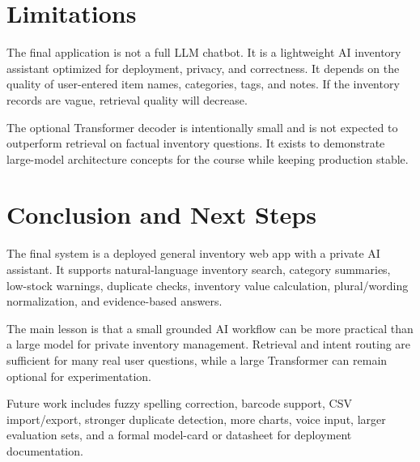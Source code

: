 \documentclass[11pt]{article}
\begin{document}
\section{Limitations}

The final application is not a full LLM chatbot. It is a lightweight AI inventory assistant optimized for deployment, privacy, and correctness. It depends on the quality of user-entered item names, categories, tags, and notes. If the inventory records are vague, retrieval quality will decrease.

The optional Transformer decoder is intentionally small and is not expected to outperform retrieval on factual inventory questions. It exists to demonstrate large-model architecture concepts for the course while keeping production stable.

\section{Conclusion and Next Steps}

The final system is a deployed general inventory web app with a private AI assistant. It supports natural-language inventory search, category summaries, low-stock warnings, duplicate checks, inventory value calculation, plural/wording normalization, and evidence-based answers.

The main lesson is that a small grounded AI workflow can be more practical than a large model for private inventory management. Retrieval and intent routing are sufficient for many real user questions, while a large Transformer can remain optional for experimentation.

Future work includes fuzzy spelling correction, barcode support, CSV import/export, stronger duplicate detection, more charts, voice input, larger evaluation sets, and a formal model-card or datasheet for deployment documentation.
\end{document}
